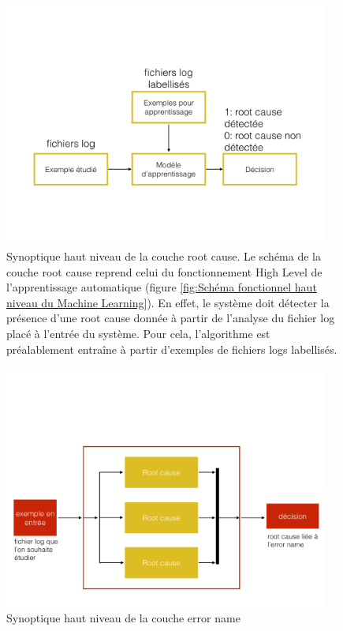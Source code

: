 \begin{figure}[h]
	\centering\includegraphics[height=8cm]{images/synoptique_root.png}
	\caption[Synoptique haut niveau de la couche root cause]{Synoptique haut niveau de la couche root cause. Le schéma de la couche root cause reprend celui du fonctionnement High Level de l'apprentissage automatique (figure \ref{fig:Schéma fonctionnel haut niveau du Machine Learning}). En effet, le système doit détecter la présence d'une root cause donnée à partir de l'analyse du fichier log placé à l'entrée du système. Pour cela, l'algorithme est préalablement entraîne à partir d'exemples de fichiers logs labellisés.}
	\label{fig:synoptique haut niveau de la solution proposée: couche root cause}
\end{figure}

\begin{figure}[h]
	\centering\includegraphics[height=8cm]{images/synoptique_error.png}
	\caption[Synoptique haut niveau de la couche error name]{Synoptique haut niveau de la couche error name}
	\label{fig:synoptique haut niveau de la solution proposée: couche error name}
\end{figure}


